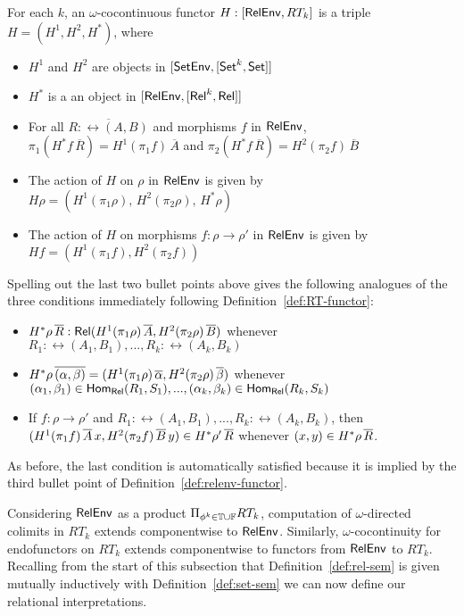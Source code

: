 \documentclass{lmcs}
\theoremstyle{plain}\newtheorem{satz}[thm]{Satz}
\newcommand{\set}{\mathsf{Set}}
\begin{document}
\begin{defi}\label{def:relenv-functor}
For each $k$, an $\omega$-cocontinuous functor $H : [\mathsf{RelEnv}, RT_k]$
is a triple $H = (H^1,H^2,H^*)$, where
\begin{itemize}
\item $H^1$ and $H^2$ are objects in $[\setenv,[\set^k,\set]]$
\item $H^*$ is a an object in $[\mathsf{RelEnv},[\mathsf{Rel}^k,\mathsf{Rel}]]$
\item For all $\overline{R : \rel(A,B)}$ and morphisms $f$ in
  $\mathsf{RelEnv}$, $\pi_1(H^*f \,{\overline{R}}) = H^1 (\pi_1
  f)\,{\overline{A}}$ and $\pi_2(H^*f \,{\overline{R}}) = H^2 (\pi_2
  f)\,{\overline{B}}$
\item The action of $H$ on $\rho$ in $\mathsf{RelEnv}$ is given by $H \rho = (H^1
  (\pi_1 \rho),\,H^2 (\pi_2 \rho),\,H^*\rho)$
\item The action of $H$ on morphisms $f : \rho \to \rho'$ in $\mathsf{RelEnv}$
  is given by $Hf = (H^1 (\pi_1 f),H^2 (\pi_2 f))$
\end{itemize}
\end{defi}
\noindent Spelling out the last two bullet points above gives the
following analogues of the three conditions immediately following
Definition~\ref{def:RT-functor}:
\begin{itemize}
\item $H^*\rho\, \overline{R} : \mathsf{Rel}(H^1(\pi_1 \rho)\, \overline{A}, H^2(\pi_2
  \rho)\, \overline{B})$ whenever $R_1 : \rel(A_1,B_1),...,R_k :
  \rel(A_k,B_k)$
\item $H^*\rho\, \overline{(\alpha, \beta)} = (H^1(\pi_1 \rho)\,\overline{\alpha},
  H^2(\pi_2 \rho)\, \overline{\beta})$ whenever $(\alpha_1, \beta_1) \in
  \mathsf{Hom_{Rel}}(R_1,S_1),..., (\alpha_k, \beta_k) \in \mathsf{Hom_{Rel}}(R_k,S_k)$
\item If $f : \rho \to \rho'$ and
  $R_1:\rel(A_1,B_1),...,R_k:\rel(A_k,B_k)$, then $(H^1(\pi_1
  f)\,{\overline{A}}\,x, H^2(\pi_2 f)\,{\overline{B}}\,y) \in H^*\rho'\,\overline{R}$
  whenever $(x, y) \in H^*\rho\,\overline{R}$.
\end{itemize}
As before, the last condition is automatically satisfied because it is
implied by the third bullet point of
Definition~\ref{def:relenv-functor}.

Considering $\mathsf{RelEnv}$ as a product $\Pi_{\phi^k \in \mathbb{T} \cup
  \mathbb{F}} RT_k$, computation of $\omega$-directed colimits in $RT_k$
extends componentwise to $\mathsf{RelEnv}$. Similarly, $\omega$-cocontinuity
for endofunctors on $RT_k$ extends componentwise to functors from
$\mathsf{RelEnv}$ to $RT_k$.  Recalling from the start of this subsection that
Definition~\ref{def:rel-sem} is given mutually inductively with
Definition~\ref{def:set-sem} we can now define our relational
interpretations.
\end{document}
